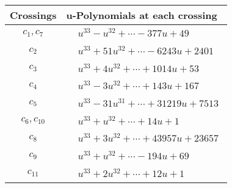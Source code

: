 \documentclass[1p]{elsarticle_modified}
\theoremstyle{definition}
\begin{document}
\begin{tabular}{m{50pt}|m{274pt}}
Crossings & \hspace{64pt}u-Polynomials at each crossing \\
\hline $$\begin{aligned}c_{1},c_{7}\end{aligned}$$&$\begin{aligned}
&u^{33}- u^{32}+\cdots-377 u+49
\end{aligned}$\\
\hline $$\begin{aligned}c_{2}\end{aligned}$$&$\begin{aligned}
&u^{33}+51 u^{32}+\cdots-6243 u+2401
\end{aligned}$\\
\hline $$\begin{aligned}c_{3}\end{aligned}$$&$\begin{aligned}
&u^{33}+4 u^{32}+\cdots+1014 u+53
\end{aligned}$\\
\hline $$\begin{aligned}c_{4}\end{aligned}$$&$\begin{aligned}
&u^{33}-3 u^{32}+\cdots+143 u+167
\end{aligned}$\\
\hline $$\begin{aligned}c_{5}\end{aligned}$$&$\begin{aligned}
&u^{33}-31 u^{31}+\cdots+31219 u+7513
\end{aligned}$\\
\hline $$\begin{aligned}c_{6},c_{10}\end{aligned}$$&$\begin{aligned}
&u^{33}+u^{32}+\cdots+14 u+1
\end{aligned}$\\
\hline $$\begin{aligned}c_{8}\end{aligned}$$&$\begin{aligned}
&u^{33}+3 u^{32}+\cdots+43957 u+23657
\end{aligned}$\\
\hline $$\begin{aligned}c_{9}\end{aligned}$$&$\begin{aligned}
&u^{33}+u^{32}+\cdots-194 u+69
\end{aligned}$\\
\hline $$\begin{aligned}c_{11}\end{aligned}$$&$\begin{aligned}
&u^{33}+2 u^{32}+\cdots+12 u+1
\end{aligned}$\\
\hline
\end{tabular}\\~\\
\end{document}
